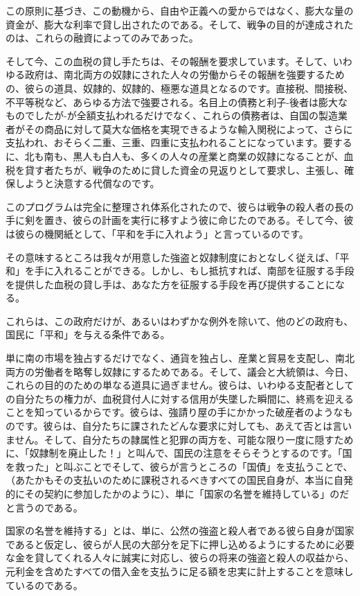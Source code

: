 \documentclass[dvipdfmx, uplatex, tate, landscape]{utbook}
\begin{document}
この原則に基づき、この動機から、自由や正義への愛からではなく、膨大な量の資金が、膨大な利率で貸し出されたのである。そして、戦争の目的が達成されたのは、これらの融資によってのみであった。

そして今、この血税の貸し手たちは、その報酬を要求しています。そして、いわゆる政府は、南北両方の奴隷にされた人々の労働からその報酬を強要するための、彼らの道具、奴隷的、奴隷的、極悪な道具となるのです。直接税、間接税、不平等税など、あらゆる方法で強要される。名目上の債務と利子-後者は膨大なものでしたが-が全額支払われるだけでなく、これらの債務者は、自国の製造業者がその商品に対して莫大な価格を実現できるような輸入関税によって、さらに支払われ、おそらく二重、三重、四重に支払われることになっています。要するに、北も南も、黒人も白人も、多くの人々の産業と商業の奴隷になることが、血税を貸す者たちが、戦争のために貸した資金の見返りとして要求し、主張し、確保しようと決意する代償なのです。

このプログラムは完全に整理され体系化されたので、彼らは戦争の殺人者の長の手に剣を置き、彼らの計画を実行に移すよう彼に命じたのである。そして今、彼は彼らの機関紙として、「平和を手に入れよう」と言っているのです。

その意味するところは我々が用意した強盗と奴隷制度におとなしく従えば、「平和」を手に入れることができる。しかし、もし抵抗すれば、南部を征服する手段を提供した血税の貸し手は、あなた方を征服する手段を再び提供することになる。

これらは、この政府だけが、あるいはわずかな例外を除いて、他のどの政府も、国民に「平和」を与える条件である。

単に南の市場を独占するだけでなく、通貨を独占し、産業と貿易を支配し、南北両方の労働者を略奪し奴隷にするためである。そして、議会と大統領は、今日、これらの目的のための単なる道具に過ぎません。彼らは、いわゆる支配者としての自分たちの権力が、血税貸付人に対する信用が失墜した瞬間に、終焉を迎えることを知っているからです。彼らは、強請り屋の手にかかった破産者のようなものです。彼らは、自分たちに課されたどんな要求に対しても、あえて否とは言いません。そして、自分たちの隷属性と犯罪の両方を、可能な限り一度に隠すために、「奴隷制を廃止した！」と叫んで、国民の注意をそらそうとするのです。「国を救った」と叫ぶことでそして、彼らが言うところの「国債」を支払うことで、（あたかもその支払いのために課税されるべきすべての国民自身が、本当に自発的にその契約に参加したかのように）、単に「国家の名誉を維持している」のだと言うのである。

国家の名誉を維持する」とは、単に、公然の強盗と殺人者である彼ら自身が国家であると仮定し、彼らが人民の大部分を足下に押し込めるようにするために必要な金を貸してくれる人々に誠実に対応し、彼らの将来の強盗と殺人の収益から、元利金を含めたすべての借入金を支払うに足る額を忠実に計上することを意味しているのである。
\end{document}
